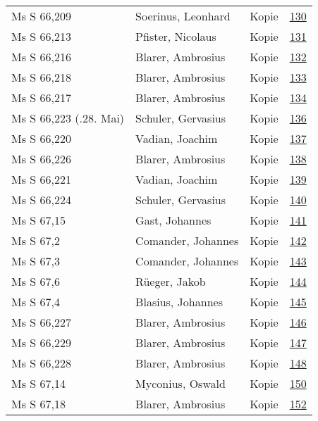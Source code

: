 \documentclass[10pt,a4paper,landscape]{report}
\begin{document}
\begin{longtable}{p{16cm}p{4cm}lr}
Ms S 66,209	&	Soerinus, Leonhard	&	Kopie	&	\href{http://130.60.24.72/assignment/130}{130}\\
Ms S 66,213	&	Pfister, Nicolaus	&	Kopie	&	\href{http://130.60.24.72/assignment/131}{131}\\
Ms S 66,216	&	Blarer, Ambrosius	&	Kopie	&	\href{http://130.60.24.72/assignment/132}{132}\\
Ms S 66,218	&	Blarer, Ambrosius	&	Kopie	&	\href{http://130.60.24.72/assignment/133}{133}\\
Ms S 66,217	&	Blarer, Ambrosius	&	Kopie	&	\href{http://130.60.24.72/assignment/134}{134}\\
Ms S 66,223 (.28. Mai)	&	Schuler, Gervasius	&	Kopie	&	\href{http://130.60.24.72/assignment/136}{136}\\
Ms S 66,220	&	Vadian, Joachim	&	Kopie	&	\href{http://130.60.24.72/assignment/137}{137}\\
Ms S 66,226	&	Blarer, Ambrosius	&	Kopie	&	\href{http://130.60.24.72/assignment/138}{138}\\
Ms S 66,221	&	Vadian, Joachim	&	Kopie	&	\href{http://130.60.24.72/assignment/139}{139}\\
Ms S 66,224	&	Schuler, Gervasius	&	Kopie	&	\href{http://130.60.24.72/assignment/140}{140}\\
Ms S 67,15	&	Gast, Johannes	&	Kopie	&	\href{http://130.60.24.72/assignment/141}{141}\\
Ms S 67,2	&	Comander, Johannes	&	Kopie	&	\href{http://130.60.24.72/assignment/142}{142}\\
Ms S 67,3	&	Comander, Johannes	&	Kopie	&	\href{http://130.60.24.72/assignment/143}{143}\\
Ms S 67,6	&	Rüeger, Jakob	&	Kopie	&	\href{http://130.60.24.72/assignment/144}{144}\\
Ms S 67,4	&	Blasius, Johannes	&	Kopie	&	\href{http://130.60.24.72/assignment/145}{145}\\
Ms S 66,227	&	Blarer, Ambrosius	&	Kopie	&	\href{http://130.60.24.72/assignment/146}{146}\\
Ms S 66,229	&	Blarer, Ambrosius	&	Kopie	&	\href{http://130.60.24.72/assignment/147}{147}\\
Ms S 66,228	&	Blarer, Ambrosius	&	Kopie	&	\href{http://130.60.24.72/assignment/148}{148}\\
Ms S 67,14	&	Myconius, Oswald	&	Kopie	&	\href{http://130.60.24.72/assignment/150}{150}\\
Ms S 67,18	&	Blarer, Ambrosius	&	Kopie	&	\href{http://130.60.24.72/assignment/152}{152}\\

\end{longtable}
\end{document}

